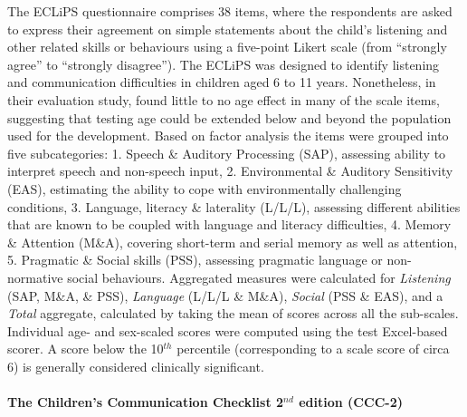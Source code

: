 \documentclass[a4paper, twoside]{templates/ociamthesis}
\begin{document}
\hfill\break
The ECLiPS questionnaire \autocite{Barry2014} comprises 38 items, where the respondents are asked to express their agreement on simple statements about the child's listening and other related skills or behaviours using a five-point Likert scale (from ``strongly agree'' to ``strongly disagree''). The ECLiPS was designed to identify listening and communication difficulties in children aged 6 to 11 years. Nonetheless, in their evaluation study, \textcite{Barry2014} found little to no age effect in many of the scale items, suggesting that testing age could be extended below and beyond the population used for the development. Based on factor analysis the items were grouped into five subcategories: 1. Speech \& Auditory Processing (SAP), assessing ability to interpret speech and non-speech input, 2. Environmental \& Auditory Sensitivity (EAS), estimating the ability to cope with environmentally challenging conditions, 3. Language, literacy \& laterality (L/L/L), assessing different abilities that are known to be coupled with language and literacy difficulties, 4. Memory \& Attention (M\&A), covering short-term and serial memory as well as attention, 5. Pragmatic \& Social skills (PSS), assessing pragmatic language or non-normative social behaviours. Aggregated measures were calculated for \emph{Listening} (SAP, M\&A, \& PSS), \emph{Language} (L/L/L \& M\&A), \emph{Social} (PSS \& EAS), and a \emph{Total} aggregate, calculated by taking the mean of scores across all the sub-scales. Individual age- and sex-scaled scores were computed using the test Excel-based scorer. A score below the 10\(^{th}\) percentile (corresponding to a scale score of circa 6) is generally considered clinically significant.\\

\hypertarget{the-childrens-communication-checklist-2nd-edition-ccc-2}{%
\paragraph{\texorpdfstring{The Children's Communication Checklist 2\(^{nd}\) edition (CCC-2)}{The Children's Communication Checklist 2\^{}\{nd\} edition (CCC-2)}}\label{the-childrens-communication-checklist-2nd-edition-ccc-2}}
\end{document}
